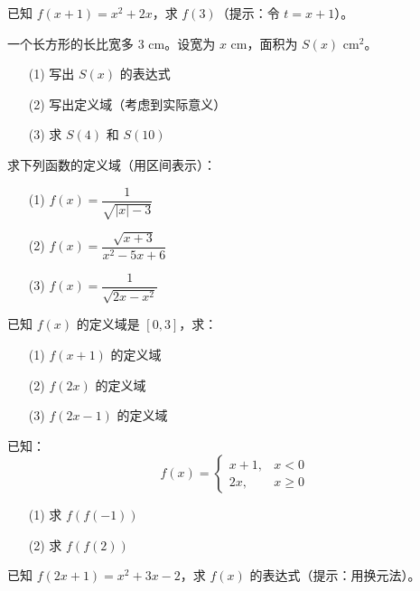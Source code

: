 \begin{exercise}[3]
已知 \(f(x + 1) = x^2 + 2x\)，求 \(f(3)\)（提示：令 \(t = x + 1\)）。
\end{exercise}

\begin{exercise}[3]
一个长方形的长比宽多 3 cm。设宽为 \(x\) cm，面积为 \(S(x)\) cm\(^2\)。
\begin{enumerate}
  \item[(1)] 写出 \(S(x)\) 的表达式
  \item[(2)] 写出定义域（考虑到实际意义）
  \item[(3)] 求 \(S(4)\) 和 \(S(10)\)
\end{enumerate}
\end{exercise}


\begin{exercise}[4]
求下列函数的定义域（用区间表示）：
\begin{enumerate}
  \item[(1)] \(f(x) = \dfrac{1}{\sqrt{|x| - 3}}\)
  \item[(2)] \(f(x) = \dfrac{\sqrt{x + 3}}{x^2 - 5x + 6}\)
  \item[(3)] \(f(x) = \dfrac{1}{\sqrt{2x - x^2}}\)
\end{enumerate}
\end{exercise}

\begin{exercise}[4]
已知 \(f(x)\) 的定义域是 \([0, 3]\)，求：
\begin{enumerate}
  \item[(1)] \(f(x + 1)\) 的定义域
  \item[(2)] \(f(2x)\) 的定义域
  \item[(3)] \(f(2x - 1)\) 的定义域
\end{enumerate}
\end{exercise}

\begin{exercise}[4]
已知：
\[
f(x) =
\begin{cases}
x + 1, & x < 0 \\
2x,    & x \ge 0
\end{cases}
\]
\begin{enumerate}
  \item[(1)] 求 \(f(f(-1))\)
  \item[(2)] 求 \(f(f(2))\)
\end{enumerate}
\end{exercise}

\begin{exercise}[4]
已知 \(f(2x + 1) = x^2 + 3x - 2\)，求 \(f(x)\) 的表达式（提示：用换元法）。
\end{exercise}

